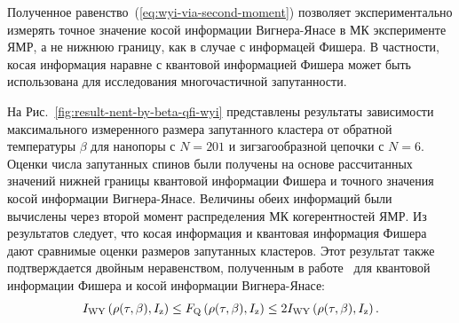 Полученное равенство~(\ref{eq:wyi-via-second-moment}) позволяет экспериментально измерять точное значение
косой информации Вигнера-Янасе в МК эксперименте ЯМР,
а не нижнюю границу, как в случае с информацей Фишера.
В частности, косая информация наравне с квантовой информацией Фишера
может быть использована для исследования многочастичной запутанности.

На Рис.~\ref{fig:result-nent-by-beta-qfi-wyi} представлены результаты зависимости максимального измеренного размера запутанного кластера от обратной температуры $\beta$ для нанопоры с $N=201$ и зигзагообразной цепочки с $N=6$.
Оценки числа запутанных спинов были получены на основе рассчитанных значений нижней границы квантовой информации Фишера и точного значения косой информации Вигнера-Янасе.
Величины обеих информаций были вычислены через второй момент распределения МК когерентностей ЯМР.
Из результатов следует,
что косая информация и квантовая информация Фишера дают сравнимые оценки размеров запутанных кластеров.
Этот результат также подтверждается двойным неравенством, полученным в работе~\cite{Luo2003pamc} для
квантовой информации Фишера и косой информации Вигнера-Янасе:
%
\begin{equation} \label{eq:qfi-wyi-inequality}
  I_\mathrm{WY}\left( \rho(\tau,\beta), I_\mathrm{z} \right)
  \leq F_\mathrm{Q} \left( \rho(\tau,\beta), I_\mathrm{z} \right)
  \leq 2I_\mathrm{WY}\left( \rho(\tau,\beta), I_\mathrm{z} \right).
\end{equation}
